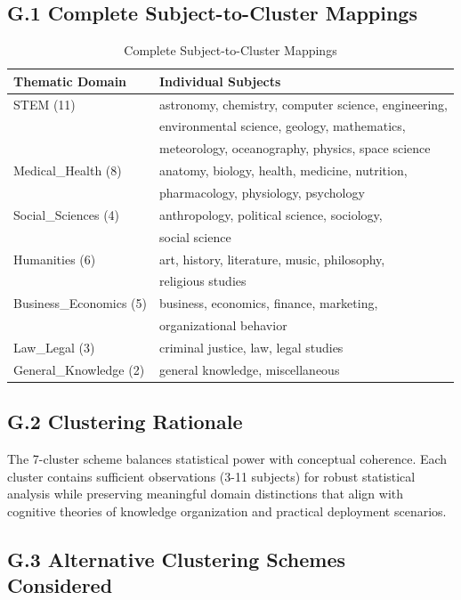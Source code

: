 \documentclass[letterpaper]{article}
\begin{document}
\subsection*{G.1 Complete Subject-to-Cluster Mappings}

\begin{table}[ht]
\centering
\caption{Complete Subject-to-Cluster Mappings}
\label{tab:subject_clusters_complete}
\begin{tabular}{ll}
\toprule
\textbf{Thematic Domain} & \textbf{Individual Subjects} \\
\midrule
STEM (11) & astronomy, chemistry, computer science, engineering, \\
& environmental science, geology, mathematics, \\
& meteorology, oceanography, physics, space science \\
\midrule
Medical\_Health (8) & anatomy, biology, health, medicine, nutrition, \\
& pharmacology, physiology, psychology \\
\midrule
Social\_Sciences (4) & anthropology, political science, sociology, \\
& social science \\
\midrule
Humanities (6) & art, history, literature, music, philosophy, \\
& religious studies \\
\midrule
Business\_Economics (5) & business, economics, finance, marketing, \\
& organizational behavior \\
\midrule
Law\_Legal (3) & criminal justice, law, legal studies \\
\midrule
General\_Knowledge (2) & general knowledge, miscellaneous \\
\bottomrule
\end{tabular}
\end{table}

\subsection*{G.2 Clustering Rationale}

The 7-cluster scheme balances statistical power with conceptual coherence. Each cluster contains sufficient observations (3-11 subjects) for robust statistical analysis while preserving meaningful domain distinctions that align with cognitive theories of knowledge organization and practical deployment scenarios.

\subsection*{G.3 Alternative Clustering Schemes Considered}
\end{document}
